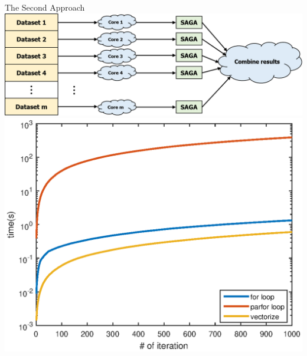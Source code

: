 \begin{frame}{The Second Approach}
	\centering
	\includegraphics[scale=0.35]{Picture2.PNG}
	\visible<2->
	{
		\medskip
		\medskip
		\centering
		\includegraphics[scale=0.5]{distributed2.eps} 
	}
\end{frame}

